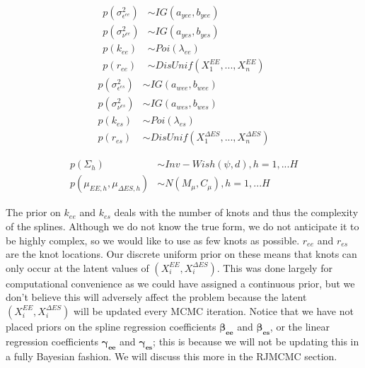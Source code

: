 \documentclass[11pt]{article}\usepackage[]{graphicx}\usepackage[]{color}
\begin{document}
\begin{multicols}{2}
\noindent 
  \begin{align}
  p(\sigma^2_{\epsilon^{ee}}) &\sim IG(a_{yee},b_{yee}) \\
  p(\sigma^2_{\nu^{ee}}) &\sim IG(a_{yes},b_{yes}) \\
  p(k_{ee}) &\sim Poi(\lambda_{ee}) \\
  p(r_{ee}) &\sim DisUnif(X_1^{EE},...,X_n^{EE})
  \end{align}
\columnbreak
  \begin{align}
  p(\sigma^2_{\epsilon^{es}}) &\sim IG(a_{wee},b_{wee}) \\
  p(\sigma^2_{\nu^{es}}) &\sim IG(a_{wes},b_{wes}) \\
  p(k_{es}) &\sim Poi(\lambda_{es}) \\
  p(r_{es}) &\sim DisUnif(X_1^{\Delta ES},...,X_n^{\Delta ES})
  \end{align}
\end{multicols}



\begin{align}
   p(\Sigma_{h}) &\sim Inv-Wish(\psi,d), h=1,...H \\
   p(\mu_{EE,h},\mu_{\Delta ES,h}) &\sim N(M_{\mu},C_{\mu}) , h=1,...H 
\end{align}



The prior on $k_{ee}$ and $k_{es}$ deals with the number of knots and thus the complexity of the splines. Although we do not know the true form, we do not anticipate it to be highly complex, so we would like to use as few knots as possible. $r_{ee}$ and $r_{es}$ are the knot locations. Our discrete uniform prior on these means that knots can only occur at the latent values of $(X_i^{EE},X_i^{\Delta ES})$. This was done largely for computational convenience as we could have assigned a continuous prior, but we don't believe this will adversely affect the problem because the latent $(X_i^{EE},X_i^{\Delta ES})$ will be updated every MCMC iteration. Notice that we have not placed priors on the spline regression coefficients $\boldsymbol{\beta_{ee}}$ and $\boldsymbol{\beta_{es}}$, or the linear regression coefficients $\boldsymbol{\gamma_{ee}}$ and $\boldsymbol{\gamma_{es}}$; this is because we will not be updating this in a fully Bayesian fashion. We will discuss this more in the RJMCMC section.
\end{document}
